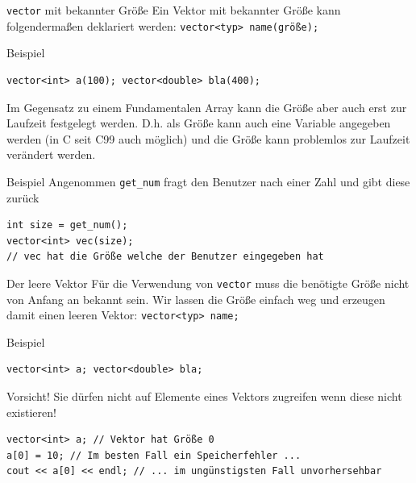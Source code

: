 \documentclass[presentation]{beamer}
\begin{document}
\begin{frame}[label={sec:org8db7f41},fragile]{{\color{solarizedYellow}\texttt{vector}} mit bekannter Größe}
 Ein Vektor mit bekannter Größe kann folgendermaßen deklariert werden: {\color{solarizedYellow}\verb!vector<typ> name(größe);!}
\begin{exampleblock}{Beispiel}
\begin{verbatim}
vector<int> a(100); vector<double> bla(400);
\end{verbatim}
\end{exampleblock}
Im Gegensatz zu einem Fundamentalen Array kann die Größe aber auch
erst \alert{zur Laufzeit} festgelegt werden. D.h. \alert{als Größe kann auch eine
Variable} angegeben werden (in C seit C99 auch möglich) und die
\alert{Größe} kann problemlos \alert{zur Laufzeit verändert werden}.
\begin{exampleblock}{Beispiel}
Angenommen {\color{solarizedYellow}\verb!get_num!} fragt den Benutzer nach einer Zahl und gibt
diese zurück
\begin{verbatim}
int size = get_num();
vector<int> vec(size);
// vec hat die Größe welche der Benutzer eingegeben hat
\end{verbatim}
\end{exampleblock}
\end{frame}
\begin{frame}[label={sec:org0110265},fragile]{Der leere Vektor}
 Für die Verwendung von {\color{solarizedYellow}\verb!vector!} muss die benötigte \alert{Größe nicht von
Anfang an bekannt sein}. Wir lassen die Größe einfach weg und erzeugen
damit einen leeren Vektor: {\color{solarizedYellow}\verb!vector<typ> name;!}
\begin{exampleblock}{Beispiel}
\begin{verbatim}
vector<int> a; vector<double> bla;
\end{verbatim}
\end{exampleblock}
\begin{alertblock}{Vorsicht!}
Sie dürfen nicht auf Elemente eines Vektors zugreifen wenn diese nicht
existieren!
\begin{verbatim}
vector<int> a; // Vektor hat Größe 0
a[0] = 10; // Im besten Fall ein Speicherfehler ...
cout << a[0] << endl; // ... im ungünstigsten Fall unvorhersehbar
\end{verbatim}
\end{alertblock}
\end{frame}
\end{document}
